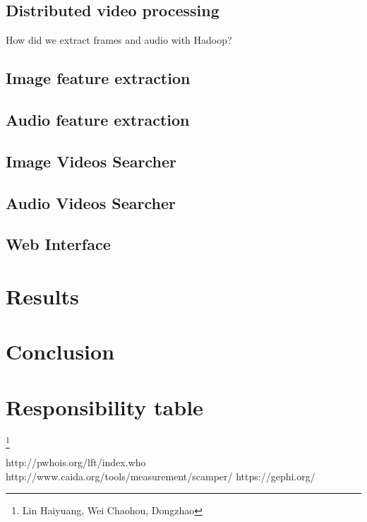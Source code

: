 \documentclass[a4paper,10pt]{article}
\begin{document}
\subsection{Distributed video processing}
How did we extract frames and audio with Hadoop?


\subsection{Image feature extraction}
\subsection{Audio feature extraction}

\subsection{Image Videos Searcher}
\subsection{Audio Videos Searcher}

\subsection{Web Interface}


\section{Results}


\section{Conclusion}


\section{Responsibility table}


\let\thefootnote\relax\footnote{Lin Haiyuang, Wei Chaohou, Dongzhao}

\begin{thebibliography}{99}
http://pwhois.org/lft/index.who
http://www.caida.org/tools/measurement/scamper/
https://gephi.org/
\end{thebibliography} 
\end{document}
